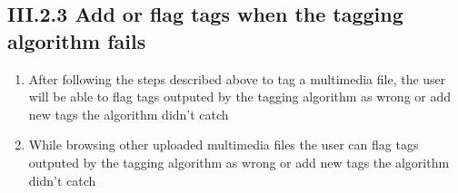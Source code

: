 \documentclass[11pt, a4papper]{report}
\theoremstyle{plain}
\theoremstyle{definition}
\theoremstyle{definition}
\theoremstyle{proposition}
\begin{document}
\subsection*{III.2.3 Add or flag tags when the tagging algorithm fails}

\begin{enumerate}
	\item{After following the steps described above to tag a multimedia file, the user will be able to flag tags outputed by the tagging algorithm as wrong or add new tags the algorithm didn't catch}
	\item{While browsing other uploaded multimedia files the user can flag tags outputed by the tagging algorithm as wrong or add new tags the algorithm didn't catch}
\end{enumerate}
\end{document}
